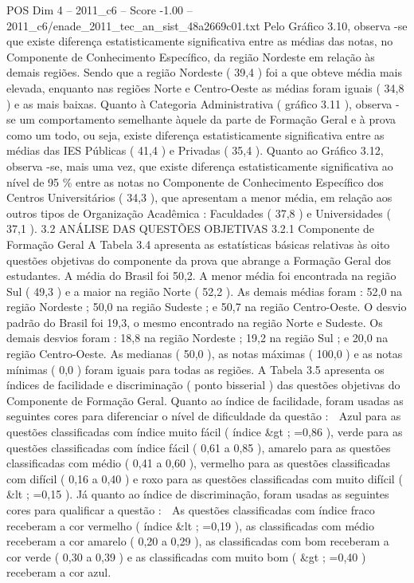 \begin{textsample}{POS Dim 4 – 2011\_c6 – Score -1.00 – 2011\_c6/enade\_2011\_tec\_an\_sist\_48a2669c01.txt}
Pelo Gráfico 3.10, observa -se que existe diferença estatisticamente significativa entre as médias das notas, no Componente de Conhecimento Específico, da região Nordeste em relação às demais regiões.
Sendo que a região Nordeste ( 39,4 ) foi a que obteve média mais elevada, enquanto nas regiões Norte e Centro-Oeste as médias foram iguais ( 34,8 ) e as mais baixas.
Quanto à Categoria Administrativa ( gráfico 3.11 ), observa -se um comportamento semelhante àquele da parte de Formação Geral e à prova como um todo, ou seja, existe diferença estatisticamente significativa entre as médias das IES Públicas ( 41,4 ) e Privadas ( 35,4 ).
Quanto ao Gráfico 3.12, observa -se, mais uma vez, que existe diferença estatisticamente significativa ao nível de 95 \% entre as notas no Componente de Conhecimento Específico dos Centros Universitários ( 34,3 ), que apresentam a menor média, em relação aos outros tipos de Organização Acadêmica : Faculdades ( 37,8 ) e Universidades ( 37,1 ). 3.2 ANÁLISE DAS QUESTÕES OBJETIVAS 3.2.1 Componente de Formação Geral A Tabela 3.4 apresenta as estatísticas básicas relativas às oito questões objetivas do componente da prova que abrange a Formação Geral dos estudantes.
A média do Brasil foi 50,2.
A menor média foi encontrada na região Sul ( 49,3 ) e a maior na região Norte ( 52,2 ).
As demais médias foram : 52,0 na região Nordeste ; 50,0 na região Sudeste ; e 50,7 na região Centro-Oeste.
O desvio padrão do Brasil foi 19,3, o mesmo encontrado na região Norte e Sudeste.
Os demais desvios foram : 18,8 na região Nordeste ; 19,2 na região Sul ; e 20,0 na região Centro-Oeste.
As medianas ( 50,0 ), as notas máximas ( 100,0 ) e as notas mínimas ( 0,0 ) foram iguais para todas as regiões.
A Tabela 3.5 apresenta os índices de facilidade e discriminação ( ponto bisserial ) das questões objetivas do Componente de Formação Geral.
Quanto ao índice de facilidade, foram usadas as seguintes cores para diferenciar o nível de dificuldade da questão :  Azul para as questões classificadas com índice muito fácil ( índice \&gt ; =0,86 ), verde para as questões classificadas com índice fácil ( 0,61 a 0,85 ), amarelo para as questões classificadas com médio ( 0,41 a 0,60 ), vermelho para as questões classificadas com difícil ( 0,16 a 0,40 ) e roxo para as questões classificadas com muito difícil ( \&lt ; =0,15 ).
Já quanto ao índice de discriminação, foram usadas as seguintes cores para qualificar a questão :  As questões classificadas com índice fraco receberam a cor vermelho ( índice \&lt ; =0,19 ), as classificadas com médio receberam a cor amarelo ( 0,20 a 0,29 ), as classificadas com bom receberam a cor verde ( 0,30 a 0,39 ) e as classificadas com muito bom ( \&gt ; =0,40 ) receberam a cor azul.

\end{textsample}
